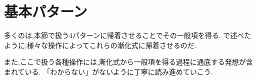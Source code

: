 ﻿%

\section{基本パターン}\label{節：基本パターン}

  多くのは,本節で扱う4パターンに帰着させることでその一般項を得る.
  で述べたように,様々な操作によってこれらの漸化式に帰着させるのだ.

  また,ここで扱う各種操作には,漸化式から一般項を得る過程に通底する発想が含まれている.
  「わからない」がないように丁寧に読み進めていこう.
  
